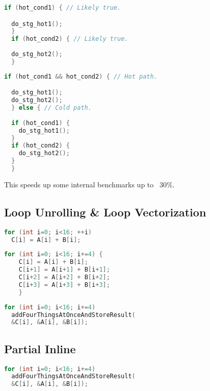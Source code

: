 \begin{lstlisting}[language=C,frame=single, caption=An ,label = lst:expr2]
  if (hot_cond1) { // Likely true.

  do_stg_hot1();
  }
  if (hot_cond2) { // Likely true.
  
  do_stg_hot2();
  }
\end{lstlisting}


\begin{lstlisting}[language=C,frame=single, caption=An ,label = lst:expr2]
  if (hot_cond1 && hot_cond2) { // Hot path.

  do_stg_hot1();
  do_stg_hot2();
  } else { // Cold path.
  
  if (hot_cond1) {
    do_stg_hot1();
  }
  if (hot_cond2) {
    do_stg_hot2();
  }
  }
\end{lstlisting}

This speeds up some internal benchmarks up to ~30\%.

\subsection{Loop Unrolling \& Loop Vectorization}


\begin{lstlisting}[language=C,frame=single, caption=An ,label = lst:expr2]
  for (int i=0; i<16; ++i)
  C[i] = A[i] + B[i];
\end{lstlisting}


\begin{lstlisting}[language=C,frame=single, caption=An ,label = lst:expr2]
  for (int i=0; i<16; i+=4) {
    C[i] = A[i] + B[i];
    C[i+1] = A[i+1] + B[i+1];
    C[i+2] = A[i+2] + B[i+2];
    C[i+3] = A[i+3] + B[i+3];
    }
\end{lstlisting}

\begin{lstlisting}[language=C,frame=single, caption=An ,label = lst:expr2]
  for (int i=0; i<16; i+=4)
  addFourThingsAtOnceAndStoreResult(
  &C[i], &A[i], &B[i]);
\end{lstlisting}
\subsection{Partial Inline}

\begin{lstlisting}[language=C,frame=single, caption=An ,label = lst:expr2]
  for (int i=0; i<16; i+=4)
  addFourThingsAtOnceAndStoreResult(
  &C[i], &A[i], &B[i]);
\end{lstlisting}

